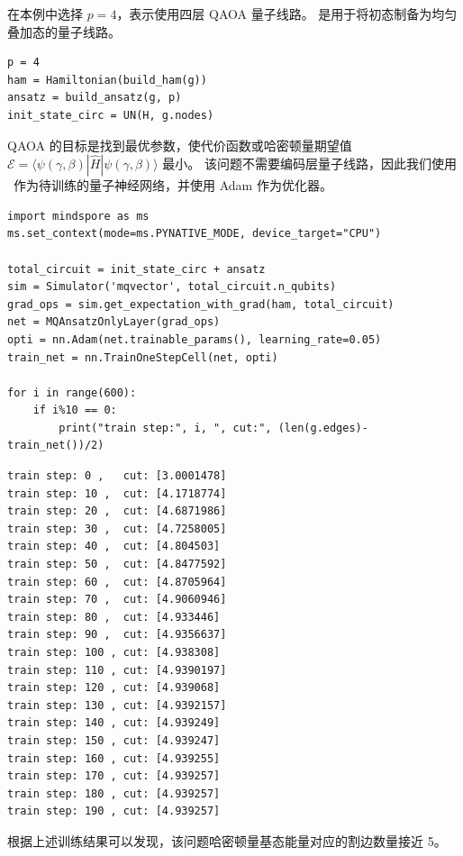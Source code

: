 在本例中选择 $p=4$，表示使用四层 QAOA 量子线路。 是用于将初态制备为均匀叠加态的量子线路。
\begin{lstlisting}
p = 4
ham = Hamiltonian(build_ham(g))
ansatz = build_ansatz(g, p)
init_state_circ = UN(H, g.nodes)
\end{lstlisting}

QAOA 的目标是找到最优参数，使代价函数或哈密顿量期望值 $\mathcal{E}=\langle \psi(\gamma, \beta)|\hat{H}|\psi(\gamma, \beta)\rangle$ 最小。
该问题不需要编码层量子线路，因此我们使用 \MQAnsatzOnlyLayer\ 作为待训练的量子神经网络，并使用 Adam 作为优化器。
\begin{lstlisting}
import mindspore as ms
ms.set_context(mode=ms.PYNATIVE_MODE, device_target="CPU")

total_circuit = init_state_circ + ansatz
sim = Simulator('mqvector', total_circuit.n_qubits)
grad_ops = sim.get_expectation_with_grad(ham, total_circuit)
net = MQAnsatzOnlyLayer(grad_ops)
opti = nn.Adam(net.trainable_params(), learning_rate=0.05)
train_net = nn.TrainOneStepCell(net, opti)

for i in range(600):
    if i%10 == 0:
        print("train step:", i, ", cut:", (len(g.edges)-train_net())/2)
\end{lstlisting}
\begin{lstlisting}
train step: 0 ,   cut: [3.0001478]
train step: 10 ,  cut: [4.1718774]
train step: 20 ,  cut: [4.6871986]
train step: 30 ,  cut: [4.7258005]
train step: 40 ,  cut: [4.804503]
train step: 50 ,  cut: [4.8477592]
train step: 60 ,  cut: [4.8705964]
train step: 70 ,  cut: [4.9060946]
train step: 80 ,  cut: [4.933446]
train step: 90 ,  cut: [4.9356637]
train step: 100 , cut: [4.938308]
train step: 110 , cut: [4.9390197]
train step: 120 , cut: [4.939068]
train step: 130 , cut: [4.9392157]
train step: 140 , cut: [4.939249]
train step: 150 , cut: [4.939247]
train step: 160 , cut: [4.939255]
train step: 170 , cut: [4.939257]
train step: 180 , cut: [4.939257]
train step: 190 , cut: [4.939257]
\end{lstlisting}

根据上述训练结果可以发现，该问题哈密顿量基态能量对应的割边数量接近 5。

